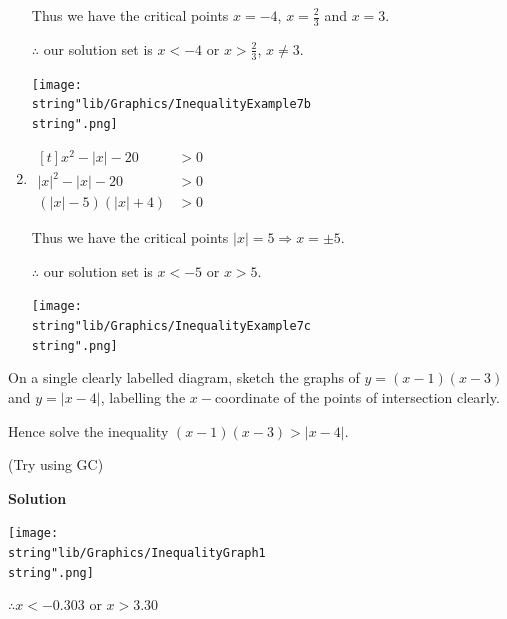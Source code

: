 \documentclass[11pt,a4paper]{book}
\begin{document}
\begin{example}
\begin{enumerate}[label=(\alph*),itemsep=1cm]
\begin{minipage}[t]{0.58\textwidth} 
Thus we have the critical points $x=-4$, ${\displaystyle x=\frac{2}{3}}$ and $x=3$.

$\therefore$ our solution set is $x<-4$ or ${\displaystyle x>\frac{2}{3}}$, $x\neq3$.
\end{minipage}
\begin{minipage}[t]{0.4\textwidth} 
\begin{center}
\texttt{[image: \\string"lib/Graphics/InequalityExample7b\\string".png]}
\par\end{center}
\end{minipage}

\item
$
\begin{aligned}[t]
x^{2}-\left|x\right|-20 & >0\\
\left|x\right|^{2}-\left|x\right|-20 & >0\\
\left(\left|x\right|-5\right)\left(\left|x\right|+4\right) & >0
\end{aligned}
$

\begin{minipage}[t]{0.58\textwidth} 
Thus we have the critical points $\left|x\right|=5\Rightarrow x=\pm5$.

$\therefore$ our solution set is ${\displaystyle x<-5}$ or $x>5$.
\end{minipage}
\begin{minipage}[t]{0.4\textwidth} 
\begin{center}
\texttt{[image: \\string"lib/Graphics/InequalityExample7c\\string".png]}
\par\end{center}
\end{minipage}

\end{enumerate}
\end{example}

\newpage

\begin{example}
On a single clearly labelled diagram, sketch the graphs of $y=\left(x-1\right)\left(x-3\right)$
and $y=\left|x-4\right|$, labelling the $x-$coordinate of the points
of intersection clearly.

Hence solve the inequality $\left(x-1\right)\left(x-3\right)>\left|x-4\right|$.

(Try using GC)

\textbf{Solution}
\begin{center}
\texttt{[image: \\string"lib/Graphics/InequalityGraph1\\string".png]}
\par\end{center}

$\therefore x<-0.303$ or $x>3.30$
\end{example}
\end{document}
